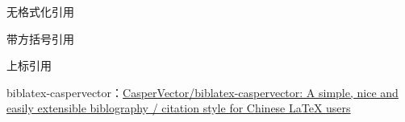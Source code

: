 \documentclass{ctexart}
\begin{document}
    无格式化引用\cite{biblatex}

    带方括号引用\parencite{3-2}

    上标引用\supercite{6-1}

    \nocite{*}
    \printbibliography[title = 文献] %

    biblatex-caspervector：\href{https://github.com/CasperVector/biblatex-caspervector}{CasperVector/biblatex-caspervector: A simple, nice and easily extensible biblography / citation style for Chinese LaTeX users}
\end{document}
